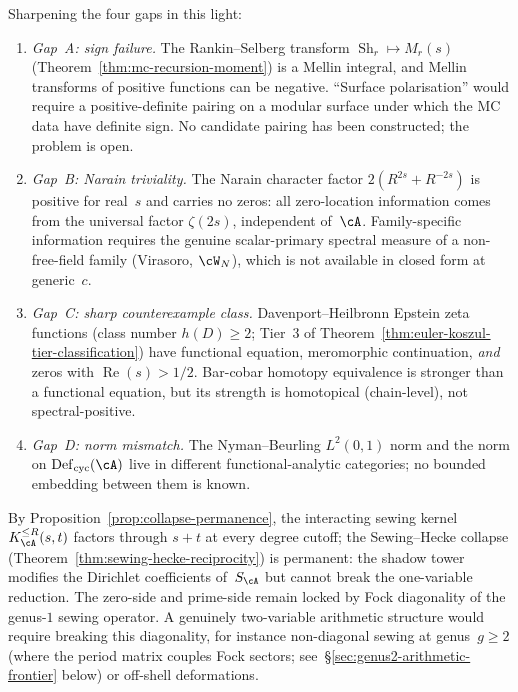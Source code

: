 \begin{remark}
Sharpening the four gaps in this light:
\begin{enumerate}[label=\textup{(\roman*)}]
\item
\emph{Gap~A\textup{:} sign failure.}
The Rankin--Selberg transform
$\operatorname{Sh}_r \mapsto M_r(s)$
(Theorem~\ref{thm:mc-recursion-moment})
is a Mellin integral, and Mellin transforms of
positive functions can be negative.
``Surface polarisation'' would require a positive-definite
pairing on a modular surface under which the MC data have
definite sign. No candidate pairing has been constructed;
the problem is open.
\item
\emph{Gap~B\textup{:} Narain triviality.}
The Narain character factor
$2(R^{2s} + R^{-2s})$ is positive for real~$s$
and carries no zeros:
all zero-location information comes from the
universal factor $\zeta(2s)$, independent of~$\cA$.
Family-specific information requires the genuine
scalar-primary spectral measure of a non-free-field
family (Virasoro, $\cW_N$), which is not available
in closed form at generic~$c$.
\item
\emph{Gap~C\textup{:} sharp counterexample class.}
Davenport--Heilbronn Epstein zeta functions
(class number $h(D) \geq 2$; Tier~3
of Theorem~\ref{thm:euler-koszul-tier-classification})
have functional equation, meromorphic continuation,
\emph{and} zeros with
$\operatorname{Re}(s) > 1/2$.
Bar-cobar homotopy equivalence is stronger than a
functional equation, but its strength is
homotopical (chain-level), not spectral-positive.
\item
\emph{Gap~D\textup{:} norm mismatch.}
The Nyman--Beurling $L^2(0,1)$ norm and the norm on
$\mathrm{Def}_{\mathrm{cyc}}(\cA)$ live in different
functional-analytic categories;
no bounded embedding between them is known.
\end{enumerate}
\end{remark}

\begin{remark}%
\label{rem:collapse-permanence}%
%
By Proposition~\ref{prop:collapse-permanence},
the interacting sewing kernel
$K_\cA^{\leq R}(s,t)$ factors through $s{+}t$ at every
degree cutoff; the Sewing--Hecke collapse
(Theorem~\ref{thm:sewing-hecke-reciprocity}) is
permanent: the shadow tower modifies the Dirichlet
coefficients of~$S_\cA$ but cannot break the
one-variable reduction. The zero-side and prime-side
remain locked by Fock diagonality of the genus-$1$
sewing operator.
A genuinely two-variable arithmetic structure
would require breaking this diagonality, for instance
non-diagonal sewing at genus~$g \geq 2$
(where the period matrix couples Fock sectors;
see~\S\ref{sec:genus2-arithmetic-frontier} below)
or off-shell deformations.
\end{remark}

